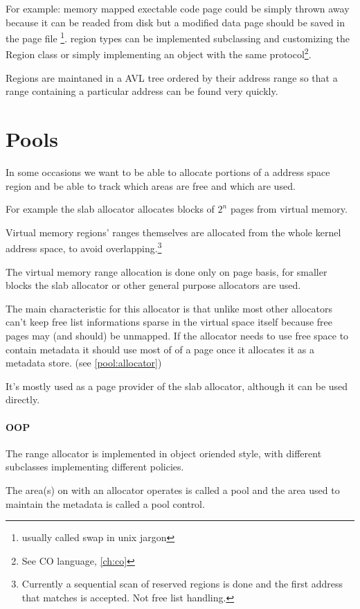 For example:
memory mapped exectable code page could be simply thrown away because it can
be readed from disk but a modified data page should be saved in the page file
\footnote{usually called swap in unix jargon}. region types can be implemented
subclassing and customizing the Region class or simply implementing an object
with the same protocol\footnote{See CO language, \ref{ch:co}}.

Regions are maintaned in a AVL tree ordered by their address range
so that a range containing a particular address can be found very quickly.

\section{Pools}

In some occasions we want to be able to allocate portions of a address space region
and be able to track which areas are free and which are used.

For example the slab allocator allocates blocks of $2^n$ pages from virtual memory.

Virtual memory regions' ranges themselves are allocated from the whole kernel address space,
to avoid overlapping.\footnote{Currently a sequential scan of reserved regions is 
done and the first address that matches is accepted. Not free list handling.}

The virtual memory range allocation is done only on page basis, for smaller blocks
the slab allocator or other general purpose allocators are used.

The main characteristic for this allocator is that unlike most other allocators
can't keep free list informations sparse in the virtual space itself because free pages may 
(and should) be unmapped. If the allocator needs to use free space to contain metadata
it should use most of of a page once it allocates it as a metadata store. (see \ref{pool:allocator})

It's mostly used as a page provider of the slab allocator, although it can be used directly.

\paragraph{OOP} The range allocator is implemented in object oriended style, with different subclasses
implementing different policies.

The area(s) on with an allocator operates is called a \textsf{pool} and the area used to
maintain the metadata is called a \textsf{pool control}.

